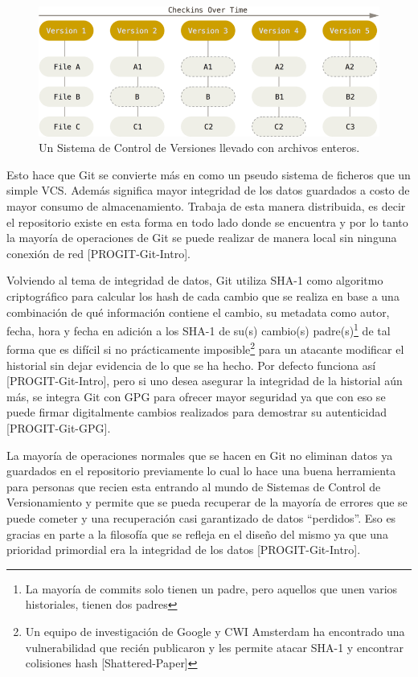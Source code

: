 \begin{figure}
  \begin{center}
      \includegraphics[width=\textwidth]{Figures/vcs-backup.png}
  \end{center}
  \caption{Un Sistema de Control de Versiones llevado con archivos enteros.} 
  \label{VCS-Backup}
\end{figure}

Esto hace que Git se convierte más en como un pseudo sistema de ficheros que un simple VCS. Además significa mayor integridad de los datos guardados a costo de mayor consumo de almacenamiento. Trabaja de esta manera distribuida, es decir el repositorio existe en esta forma en todo lado donde se encuentra y por lo tanto la mayoría de operaciones de Git se puede realizar de manera local sin ninguna conexión de red [PROGIT-Git-Intro].

Volviendo al tema de integridad de datos, Git utiliza SHA-1 como algoritmo criptográfico para calcular los hash de cada cambio que se realiza en base a una combinación de qué información contiene el cambio, su metadata como autor, fecha, hora y fecha en adición a los SHA-1 de su(s) cambio(s) padre(s)\footnote{La mayoría de commits solo tienen un padre, pero aquellos que unen varios historiales, tienen dos padres} de tal forma que es difícil si no prácticamente imposible\footnote{Un equipo de investigación de Google y CWI Amsterdam ha encontrado una vulnerabilidad que recién publicaron y les permite atacar SHA-1 y encontrar colisiones hash [Shattered-Paper]} para un atacante modificar el historial sin dejar evidencia de lo que se ha hecho. Por defecto funciona así [PROGIT-Git-Intro], pero si uno desea asegurar la integridad de la historial aún más, se integra Git con GPG para ofrecer mayor seguridad ya que con eso se puede firmar digitalmente cambios realizados para demostrar su autenticidad [PROGIT-Git-GPG].
 
La mayoría de operaciones normales  que se hacen en Git no eliminan datos ya guardados en el repositorio previamente lo cual lo hace una buena herramienta para personas que recien esta entrando al mundo de Sistemas de Control de Versionamiento y permite que se pueda recuperar de la mayoría de errores que se puede cometer y una recuperación casi garantizado de datos “perdidos”. Eso es gracias en parte a la filosofía que se refleja en el diseño del mismo ya que una prioridad primordial era la integridad de los datos [PROGIT-Git-Intro].
 
